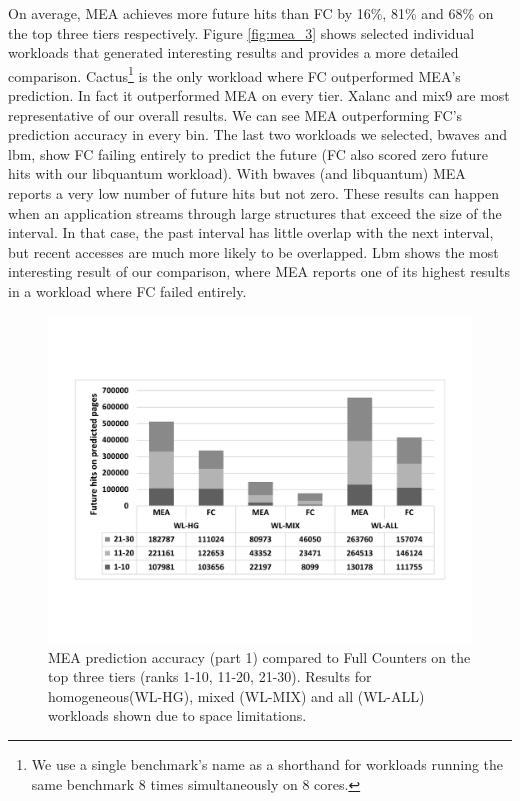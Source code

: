 On average, MEA achieves more future hits than FC by 16\%, 81\% and 68\% on the top three tiers respectively. Figure \ref{fig:mea_3} shows selected individual workloads that generated interesting results and provides a more detailed comparison. Cactus\footnote{We use a single benchmark's name as a shorthand for workloads running the same benchmark 8 times simultaneously on 8 cores.} is the only workload where FC outperformed MEA's prediction. In fact it outperformed MEA on every tier. Xalanc and mix9 are most representative of our overall
results. We can see MEA outperforming FC's prediction accuracy in every bin. 
The last two workloads we selected, bwaves and lbm, show FC failing entirely to predict the future (FC also scored zero future hits with our libquantum workload). With bwaves (and libquantum) MEA reports a very low number of future hits but not zero. These results can happen when an application streams through large structures
that exceed the size of the interval.  In that case, the past interval has 
little overlap with the next interval, but recent accesses are much more
likely to be overlapped.
Lbm shows the most interesting result of our comparison, where MEA reports one of its highest results in a workload where FC failed entirely. 


\begin{figure}[t]
\centering
  \includegraphics[scale=.3]{figures/mea_2_v2.pdf}
  \caption{MEA prediction accuracy (part 1) compared to Full Counters on the top three tiers (ranks 1-10, 11-20, 21-30). Results for homogeneous(WL-HG), mixed (WL-MIX) and all (WL-ALL) workloads shown due to space limitations.}
  \label{fig:mea_2}
\end{figure}

